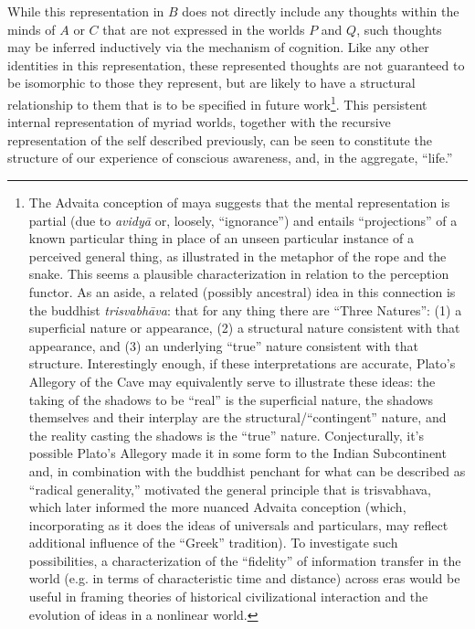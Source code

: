 \documentclass[pra,twocolumn,groupedaddress,10pt]{revtex4}
\theoremstyle{definition}
\begin{document}
While this representation in $B$ does not directly include any thoughts within the minds of $A$ or $C$ that are not expressed in the worlds $P$ and $Q$, such thoughts may be inferred inductively via the mechanism of cognition. Like any other identities in this representation, these represented thoughts are not guaranteed to be isomorphic to those they represent, but are likely to have a structural relationship to them that is to be specified in future work\footnote{The Advaita conception of maya suggests that the mental representation is partial (due to \textit{avidy\={a}} or, loosely, ``ignorance'') and entails ``projections'' of a known particular thing in place of an unseen particular instance of a perceived general thing, as illustrated in the metaphor of the rope and the snake\cite{waite}. This seems a plausible characterization in relation to the perception functor. As an aside, a related (possibly ancestral) idea in this connection is the buddhist \emph{trisvabh\={a}va}: that for any thing there are ``Three Natures'': (1) a superficial nature or appearance, (2) a structural nature consistent with that appearance, and (3) an underlying ``true'' nature consistent with that structure\cite{trisvabhava}. Interestingly enough, if these interpretations are accurate, Plato's Allegory of the Cave may equivalently serve to illustrate these ideas: the taking of the shadows to be ``real'' is the superficial nature, the shadows themselves and their interplay are the structural/``contingent'' nature, and the reality casting the shadows is the ``true'' nature. Conjecturally, it's possible Plato's Allegory made it in some form to the Indian Subcontinent and, in combination with the buddhist penchant for what can be described as ``radical generality,'' motivated the general principle that is trisvabhava, which later informed the more nuanced Advaita conception (which, incorporating as it does the ideas of universals and particulars, may reflect additional influence of the ``Greek'' tradition). To investigate such possibilities, a characterization of the ``fidelity'' of information transfer in the world (e.g. in terms of characteristic time and distance) across eras would be useful in framing theories of historical civilizational interaction and the evolution of ideas in a nonlinear world.}. This persistent internal representation of myriad worlds, together with the recursive representation of the self described previously, can be seen to constitute the structure of our experience of conscious awareness, and, in the aggregate, ``life.''
\end{document}
